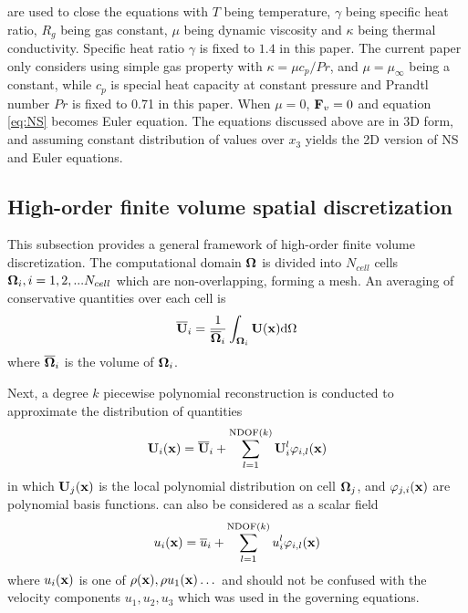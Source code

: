 are used to close the equations
with $T$ being temperature, $\gamma$ being specific heat ratio,
$R_g$ being  gas constant, $\mu$ being dynamic viscosity and
$\kappa$ being thermal conductivity.
Specific heat ratio $\gamma$ is fixed to $1.4$ in this paper.
The current paper only
considers using simple gas property
with $\kappa = \mu c_p / Pr$,
and $\mu=\mu_{\infty}$ being a constant,
while $c_p$ is special heat capacity
at constant pressure and
Prandtl number $Pr$ is fixed to 0.71 in this paper.
When $\mu=0$,
$\mathbf{F}_v=0$ and
equation \eqref{eq:NS} becomes Euler equation.
The equations discussed above are in 3D form, and
assuming constant distribution of values over $x_3$
yields the 2D version of NS and Euler equations.

\subsection{High-order finite volume spatial discretization}
\label{ssec:FV}




This subsection provides a general framework of
high-order
finite volume discretization.
The computational domain $\mathbf{\Omega}$ is divided
into $N_{cell}$ cells $\mathbf{\Omega}_i, i=1,2,...N_{cell}$ which
are non-overlapping, forming a mesh.
An averaging of conservative quantities
over each cell is
\begin{equation}
    \label{eq:FVMean}
    \overline{\mathbf{U}}_i = \frac{1}{\overline{\mathbf{\Omega}}_i}\int_{\mathbf{\Omega}_i}\mathbf{U}(\mathbf{x})\dd \Omega
\end{equation}
where $\overline{\mathbf{\Omega}}_i$ is the volume of $\mathbf{\Omega}_i$.

Next, a degree $k$ piecewise polynomial reconstruction is
conducted to approximate the distribution of
quantities
\begin{equation}
    \label{eq:FVRec}
    \mathbf{U}_i(\mathbf{x}) = \overline{\mathbf{U}}_i + \sum_{l=1}^{\mathrm{NDOF}(k)}{\mathbf{U}_i^l\varphi_{i,l}(\mathbf{x}) }
\end{equation}
in which $\mathbf{U}_j(\mathbf{x})$ is the local polynomial distribution on cell $\mathbf{\Omega}_{j}$,
and
$\varphi_{j,i}(\mathbf{x})$ are
polynomial basis functions.
 can also be considered as a scalar field
\begin{equation}
    \label{eq:FVRecScalar}
    u_i(\mathbf{x}) = \overline{u}_i + \sum_{l=1}^{\mathrm{NDOF}(k)}{u_i^l\varphi_{i,l}(\mathbf{x}) }
\end{equation}
where $u_i(\mathbf{x})$ is one of $\rho(\mathbf{x}), \rho u_1(\mathbf{x})\dots$ and should not
be confused with the velocity components $u_1, u_2, u_3$
which was used in the governing equations.

